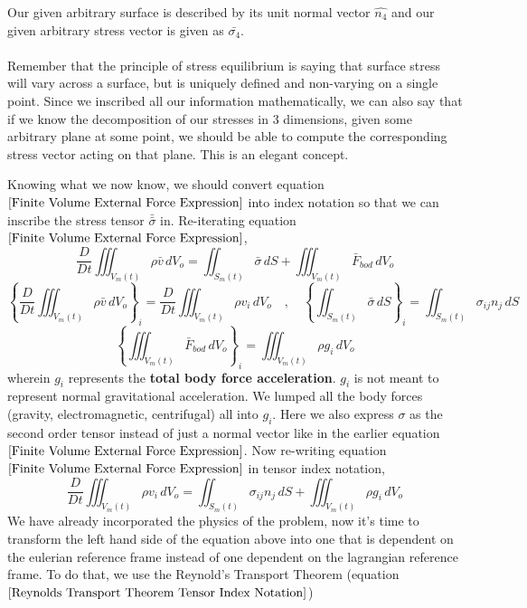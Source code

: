 Our given arbitrary surface is described by its unit normal vector $\hat{n_{4}}$ and our given arbitrary stress vector is given as $\bar{\sigma_{4}}$.
\\~\\Remember that the principle of stress equilibrium is saying that surface stress will vary across a surface, but is uniquely defined and non-varying on a single point.
Since we inscribed all our information mathematically, we can also say that if we know the decomposition of our stresses in $3$ dimensions, given some arbitrary plane at some point, we should be able to compute the corresponding stress vector acting on that plane.
This is an elegant concept.


Knowing what we now know, we should convert equation $\ref{Finite Volume External Force Expression}$ into index notation so that we can inscribe the stress tensor $\bar{\bar{\sigma}}$ in.
Re-iterating equation $\ref{Finite Volume External Force Expression}$,
$$\frac{D}{Dt}\iiint^{}_{V_{m}(t)} \rho \bar{v} \,dV_{o} = \iint^{}_{S_{m}(t)} \bar{\sigma} \,dS + \iiint^{}_{V_{m}(t)} \bar{F}_{bod} \,dV_{o}$$
$$\left\{\frac{D}{Dt}\iiint^{}_{V_{m}(t)} \rho \bar{v} \,dV_{o}\right\}_{i} = \frac{D}{Dt}\iiint^{}_{V_{m}(t)} \rho v_{i} \,dV_{o} \quad,\quad
\left\{\iint^{}_{S_{m}(t)} \bar{\sigma} \,dS\right\}_{i} = \iint^{}_{S_{m}(t)} \sigma_{ij}n_{j} \,dS$$
$$\left\{\iiint^{}_{V_{m}(t)} \bar{F}_{bod} \,dV_{o}\right\}_{i} = \iiint^{}_{V_{m}(t)} \rho g_{i} \,dV_{o}$$
wherein $g_{i}$ represents the \textbf{total body force acceleration}.
$g_{i}$ is not meant to represent normal gravitational acceleration.
We lumped all the body forces (gravity, electromagnetic, centrifugal) all into $g_{i}$.
Here we also express $\sigma$ as the second order tensor instead of just a normal vector like in the earlier equation $\ref{Finite Volume External Force Expression}$.
Now re-writing equation $\ref{Finite Volume External Force Expression}$ in tensor index notation,
\begin{equation}\frac{D}{Dt}\iiint^{}_{V_{m}(t)} \rho v_{i} \,dV_{o} = \iint^{}_{S_{m}(t)} \sigma_{ij}n_{j} \,dS + \iiint^{}_{V_{m}(t)} \rho g_{i} \,dV_{o} \label{Tensor Index Notation Momentum Primitive 1}\end{equation}
We have already incorporated the physics of the problem, now it's time to transform the left hand side of the equation above into one that is dependent on the eulerian reference frame instead of one dependent on the lagrangian reference frame.
To do that, we use the Reynold's Transport Theorem (equation $\ref{Reynolds Transport Theorem Tensor Index Notation}$)
